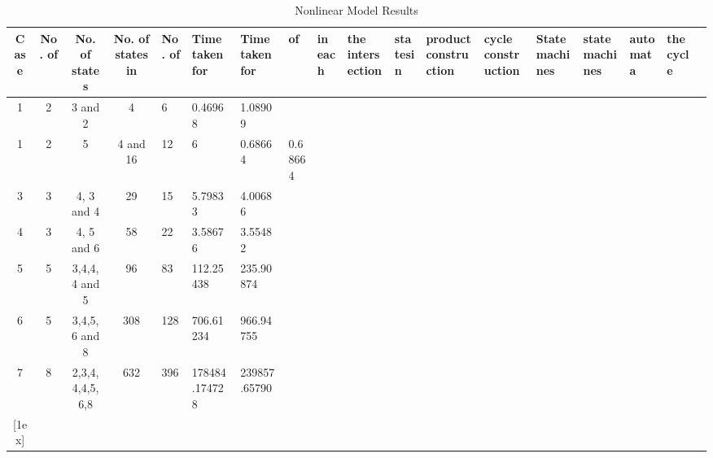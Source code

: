 \begin{table}[ht]
\caption{Nonlinear Model Results}
\centering
\begin{tabular}{c c c c}
\hline
\hline %
Case & No. of         & No. of states   &  No. of states in   & No. of    &  Time taken for        &   Time taken for             
     & of             &  in each        &  the intersection   & statesin  &  product construction  &    cycle construction    
     & Statemachines  & statemachines   &  automata          & the cycle  &                        &                           \\
\hline

1 & 2 & 3 and 2 & 4 & 6 &  0.46968    & 1.08909 \\

1 & 2 & 5 & 4 and 16 & 12 & 6 &  0.68664  & 0.68664 \\

3 & 3 & 4, 3 and 4 & 29 & 15 &5.79833 & 4.00686\\

4 & 3 & 4, 5 and 6 & 58 & 22 & 3.58676 & 3.55482\\

5 & 5 & 3,4,4,4 and 5 & 96 & 83 & 112.25438 & 235.90874\\

6 & 5 & 3,4,5,6 and 8 & 308 & 128 & 706.61234 & 966.94755\\

7 & 8 & 2,3,4,4,4,5,6,8 & 632 & 396 & 178484.174728 & 239857.65790\\




[1ex] 

\hline

\end{tabular}
\label{table:nonlin}

\end{table}
